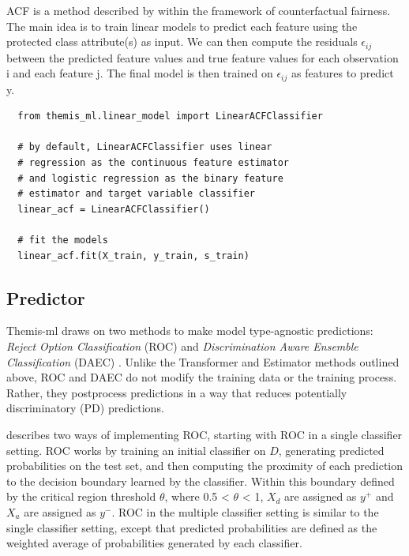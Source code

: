 \documentclass{acm_proc_article-sp}
\begin{document}
ACF is a method described by \cite{kusner2017counterfactual} within the
framework of counterfactual fairness. The main idea is to train linear models to
predict each feature using the protected class attribute(s) as input. We can
then compute the residuals \(\epsilon_{ij}\) between the predicted feature
values and true feature values for each observation i and each feature j. The
final model is then trained on \(\epsilon_{ij}\) as features to predict y.

\begin{verbatim}
  from themis_ml.linear_model import LinearACFClassifier

  # by default, LinearACFClassifier uses linear
  # regression as the continuous feature estimator
  # and logistic regression as the binary feature
  # estimator and target variable classifier
  linear_acf = LinearACFClassifier()

  # fit the models
  linear_acf.fit(X_train, y_train, s_train)
\end{verbatim}

\subsection{Predictor}

Themis-ml draws on two methods to make model type-agnostic predictions:
\emph{Reject Option Classification} (ROC) and \emph{Discrimination Aware
Ensemble Classification} (DAEC) \cite{kamiran2012decision}. Unlike the
Transformer and Estimator methods outlined above, ROC and DAEC do not modify the
training data or the training process. Rather, they postprocess predictions in a
way that reduces potentially discriminatory (PD) predictions.

\cite{kamiran2012decision} describes two ways of implementing ROC, starting with
ROC in a single classifier setting. ROC works by training an initial classifier
on \(D\), generating predicted probabilities on the test set, and then computing the
proximity of each prediction to the decision boundary learned by the classifier.
Within this boundary defined by the critical region threshold \(\theta\), where
0.5 < \(\theta\) < 1, \(X_d\) are assigned as \(y^{+}\) and \(X_a\) are assigned
as \(y^{-}\). ROC in the multiple classifier setting is similar to the single
classifier setting, except that predicted probabilities are defined as the
weighted average of probabilities generated by each classifier.
\end{document}
